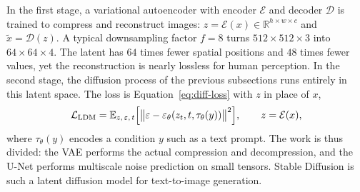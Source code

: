 In the first stage, a variational autoencoder with encoder $\mathcal E$ and
decoder $\mathcal D$ is trained to compress and reconstruct images:
$z=\mathcal E(x)\in\mathbb R^{h\times w\times c}$ and
$\tilde x=\mathcal D(z)$. A typical downsampling factor $f=8$ turns
$512\times512\times3$ into $64\times64\times4$. The latent has $64$ times
fewer spatial positions and $48$ times fewer values, yet the reconstruction
is nearly lossless for human perception. In the second stage, the diffusion
process of the previous subsections runs entirely in this latent space. The
loss is Equation~\ref{eq:diff-loss} with $z$ in place of $x$,
\begin{equation}
  \mathcal L_{\mathrm{LDM}} = \mathbb E_{z,\,\varepsilon,\,t}\Bigl[
  \bigl\|\varepsilon-\varepsilon_\theta(z_t,t,\tau_\theta(y))\bigr\|^2\Bigr],
  \qquad z=\mathcal E(x),
  \label{eq:diff-ldm}
\end{equation}
\noindent
where $\tau_\theta(y)$ encodes a condition $y$ such as a text prompt. The
work is thus divided: the VAE performs the actual compression and
decompression, and the U-Net performs multiscale noise prediction on small
tensors. Stable Diffusion is such a latent diffusion model for text-to-image
generation.

